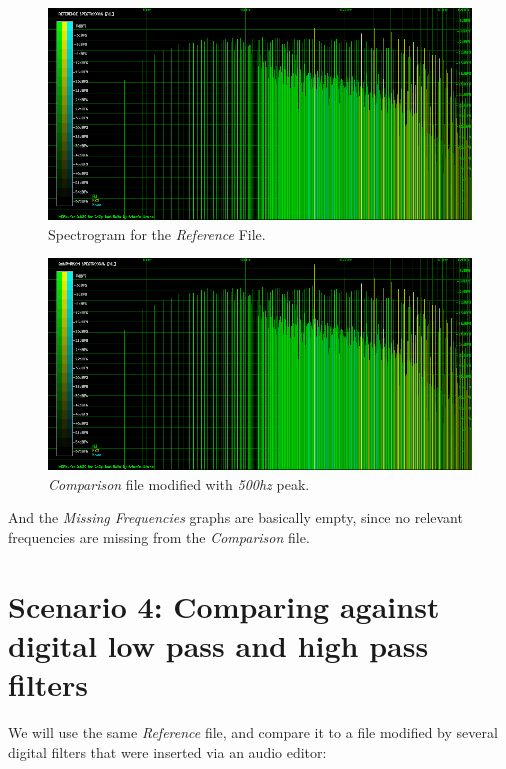 \documentclass[10pt,a4paper]{report}
\newcommand{\hz}[1]{\textit{\mbox{#1\acrshort{hz}}}}
\begin{document}
\begin{figure}[H]
	\centering
	\includegraphics[width=1.0\linewidth]{images/interpretation/Plot3-Spectrogram.png}
	\caption[Reference File]{Spectrogram for the \textit{Reference} File.}
	\label{fig:plot3-spectrogram}
\end{figure}

\begin{figure}[H]
	\centering
	\includegraphics[width=1.0\linewidth]{images/interpretation/Plot3-Spectrogram-500hz.png}
	\caption[Reference File]{\textit{Comparison} file modified with \hz{500} peak.}
	\label{fig:plot3-spectrogram-500Hz}
\end{figure}


And the \textit{Missing Frequencies} graphs are basically empty, since no relevant frequencies are missing from the \textit{Comparison} file.

\section{Scenario 4: Comparing against digital low pass and high pass filters}

We will use the same \textit{Reference} file, and compare it to a file modified by several digital filters that were inserted via an audio editor:
\end{document}
